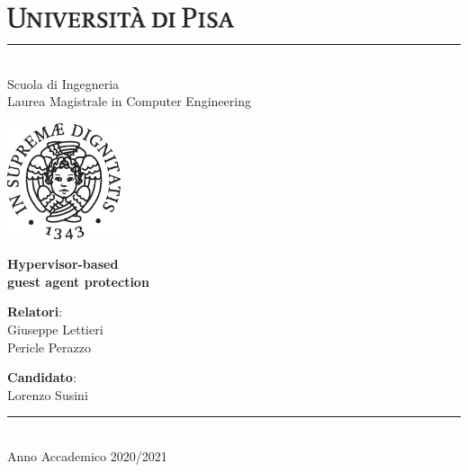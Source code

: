 \begin{titlepage}
    \begin{center}

   
        \includegraphics[width=0.5\textwidth]{images/logo_black.eps}\\
        \rule{350pt}{0.3pt} \\
        \vspace{0.5cm}
        \LARGE
        Scuola di Ingegneria\\
        Laurea Magistrale in Computer Engineering \\
        \vspace{1cm}
  
        \includegraphics[width=0.25\textwidth]{images/cherubino_black.eps}
        
        \vspace{1cm}
        \huge
        \textbf{Hypervisor-based \\ guest agent protection}
        
        
        \large
        \vfill
        \vspace{1cm}
        \begin{minipage}[t]{0.4\textwidth}
        	{{\textbf{Relatori}:\\Giuseppe Lettieri \\ Pericle Perazzo}}
        	\vspace{0.5cm}
        \end{minipage}
        \begin{minipage}[t]{0.4\textwidth}\raggedleft
        	{{\textbf{Candidato}:\\ Lorenzo Susini \\ }}
        \end{minipage}
        
        \vfill

        \rule{350pt}{0.3pt} \\
        \vspace{0.2cm}
        \large
        Anno Accademico 2020/2021


 
        
    \end{center}
\end{titlepage}